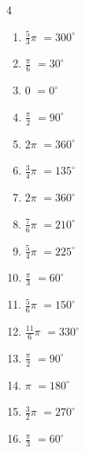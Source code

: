 \newpage
\resetdrill

\begin{multicols}{4}
\begin{enumerate}
  \itemsep=3pt
  \item $\displaystyle \frac{5}{3}\pi$
        $\displaystyle =300^{\circ}$

  \item $\displaystyle \frac{\pi}{6}$
        $\displaystyle =30^{\circ}$

  \item $\displaystyle 0$
        $\displaystyle =0^{\circ}$

  \item $\displaystyle \frac{\pi}{2}$
        $\displaystyle =90^{\circ}$

  \item $\displaystyle 2\pi$
        $\displaystyle =360^{\circ}$

  \item $\displaystyle \frac{3}{4}\pi$
        $\displaystyle =135^{\circ}$

  \item $\displaystyle 2\pi$
        $\displaystyle =360^{\circ}$

  \item $\displaystyle \frac{7}{6}\pi$
        $\displaystyle =210^{\circ}$

  \item $\displaystyle \frac{5}{4}\pi$
        $\displaystyle =225^{\circ}$

  \item $\displaystyle \frac{\pi}{3}$
        $\displaystyle =60^{\circ}$

  \item $\displaystyle \frac{5}{6}\pi$
        $\displaystyle =150^{\circ}$

  \item $\displaystyle \frac{11}{6}\pi$
        $\displaystyle =330^{\circ}$

  \item $\displaystyle \frac{\pi}{2}$
        $\displaystyle =90^{\circ}$

  \item $\displaystyle \pi$
        $\displaystyle =180^{\circ}$

  \item $\displaystyle \frac{3}{2}\pi$
        $\displaystyle =270^{\circ}$

  \item $\displaystyle \frac{\pi}{3}$
        $\displaystyle =60^{\circ}$


\end{enumerate}
\end{multicols}
